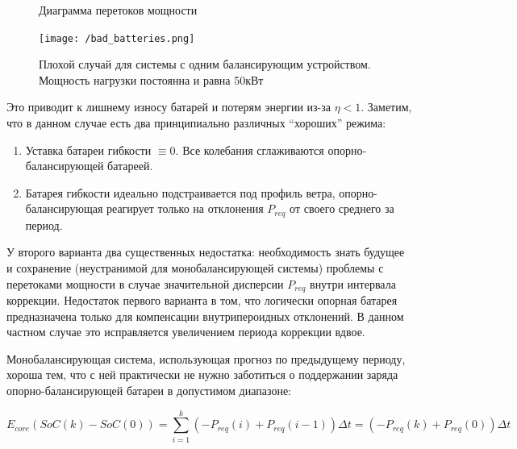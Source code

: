 \documentclass{report}
\begin{document}
\begin{figure}[]
\centering
\caption{Диаграмма перетоков мощности}
\label{fig:power_flow_graph}
\end{figure}

\begin{figure}[]
\texttt{[image: /bad\_batteries.png]}
\centering
\caption{Плохой случай для системы с одним балансирующим устройством. Мощность нагрузки постоянна и равна 50кВт}
\label{fig:bad_batteries}
\end{figure}

Это приводит к лишнему износу батарей и потерям энергии из-за $\eta < 1$.
Заметим, что в данном случае есть два принципиально различных ``хороших'' режима: 
\begin{enumerate}
    \item  Уставка батареи гибкости $\equiv  0$.
    Все колебания сглаживаются опорно-балансирующей батареей. 
    \item Батарея гибкости идеально подстраивается под профиль ветра, опорно-балансирующая реагирует только на отклонения $P_{req}$ от своего среднего за период.
\end{enumerate}

У второго варианта два существенных недостатка: 
необходимость знать будущее и сохранение (неустранимой для монобалансирующей системы) проблемы с перетоками мощности в случае значительной дисперсии $P_{req}$ внутри интервала коррекции.
Недостаток первого варианта в том, что логически опорная батарея предназначена только для компенсации внутрипероидных отклонений.
В данном частном случае это исправляется увеличением периода коррекции вдвое.

Монобалансирующая система, использующая прогноз по предыдущему периоду, хороша тем, что с ней практически не нужно заботиться о поддержании заряда опорно-балансирующей батареи в допустимом диапазоне:

\begin{equation}
    E_{core}(SoC(k) - SoC(0)) = \sum_{i=1}^k \left( -P_{req}(i) + P_{req}(i-1)\right) \Delta t = 
     \left( -P_{req}(k) + P_{req}(0) \right) \Delta t
\end{equation}
\end{document}
